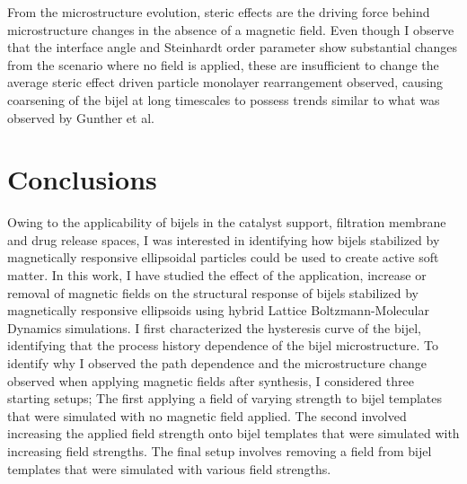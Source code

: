 From the microstructure evolution, steric effects are the
driving force behind microstructure changes in the absence of a magnetic
field. Even though I observe that the interface angle and Steinhardt
order parameter show substantial changes from the scenario where no
field is applied, these are insufficient to change the average steric
effect driven particle monolayer rearrangement observed, causing
coarsening of the bijel at long timescales to possess trends similar to what was observed by
Gunther et al. \cite{gunther_timescales_2014}

\section{Conclusions}

Owing to the applicability of bijels in the catalyst support, filtration membrane and drug release spaces, I was interested in identifying how bijels stabilized 
by magnetically responsive ellipsoidal particles could be used to create active soft matter. In this work, I have studied the effect of the application, increase 
or removal of magnetic fields on the structural response of bijels stabilized by magnetically responsive ellipsoids using hybrid Lattice Boltzmann-Molecular Dynamics 
simulations. I first characterized the hysteresis curve of the bijel, identifying that the process history dependence of the bijel microstructure. To identify why 
I observed the path dependence and the microstructure change observed when applying magnetic fields after synthesis, I considered three starting setups; The first 
applying a field of varying strength to bijel templates that were simulated with no magnetic field applied. The second involved increasing the applied field 
strength onto bijel templates that were simulated with increasing field strengths. The final setup involves removing a field from bijel templates that were simulated 
with various field strengths. 

